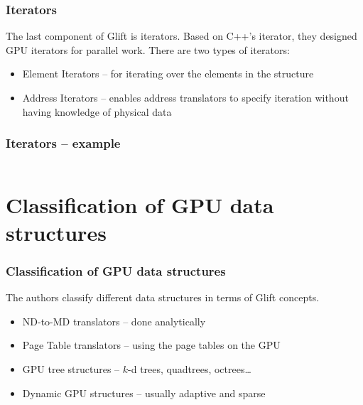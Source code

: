 \documentclass[xcolor={usenames,dvipsnames}]{beamer}
\begin{document}
\begin{frame}
  \frametitle{Iterators}

  The last component of Glift is iterators. Based on C++'s iterator, they
  designed GPU iterators for parallel work. There are two types of iterators:
  \begin{itemize}
  \item<2-> Element Iterators -- for iterating over the elements in the
    structure
  \item<3-> Address Iterators -- enables address translators to specify
    iteration without having knowledge of physical data
  \end{itemize}
\end{frame}

\begin{frame}[fragile]
  \frametitle{Iterators -- example}
  \inputminted[frame=single]{c}{code/laplace.c}
\end{frame}

\section{Classification of GPU data structures}
\begin{frame}
  \frametitle{Classification of GPU data structures}

  The authors classify different data structures in terms of Glift concepts.
  \begin{itemize}
  \item<2-> ND-to-MD translators -- done analytically
  \item<3-> Page Table translators -- using the page tables on the GPU
  \item<4-> GPU tree structures -- $k$-d trees, quadtrees, octrees\ldots
  \item<5-> Dynamic GPU structures -- usually adaptive and sparse
  \end{itemize}
\end{frame}
\end{document}
